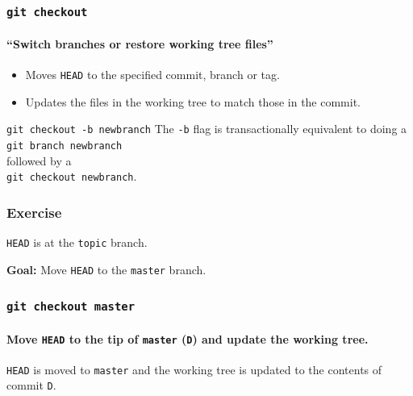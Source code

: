 \documentclass{beamer}
\newcommand\gitcmd[1]{\texttt{git #1}}
\newcommand\gflag[1]{\texttt{#1}}
\newcommand\grefspec[1]{\texttt{#1}}
\newcommand\gbranch[1]{\texttt{#1}}
\newcommand\gHEAD{\texttt{HEAD}}
\newcommand\goal[1]{\textbf{Goal:} #1}
\begin{document}
\begin{frame}
  \frametitle{\gitcmd{checkout}}
  \framesubtitle{``Switch branches or restore working tree files''}
  \begin{itemize}
    \item Moves \gHEAD{} to the specified commit, branch or tag.
    \item Updates the files in the working tree to match those in the commit.
  \end{itemize}
  \vfill
  \begin{block}{\gitcmd{checkout -b newbranch}}
    The \gflag{-b} flag is transactionally equivalent to doing a\\
    \hspace{2em}\gitcmd{branch newbranch}\\
    followed by a\\
    \hspace{2em}\gitcmd{checkout newbranch}.
  \end{block}
\end{frame}

\begin{frame}
  \frametitle{Exercise}
  \gHEAD{} is at the \gbranch{topic} branch.

  \goal{Move \gHEAD{} to the \gbranch{master} branch.}

  \begin{figure}
    \centering
  \end{figure}
\end{frame}

\begin{frame}
  \frametitle{\gitcmd{checkout master}}
  \framesubtitle{Move \gHEAD{} to the tip of \gbranch{master} (\grefspec{D}) and update the working tree.}
  \begin{figure}
    \centering
  \end{figure}

  \gHEAD{} is moved to \gbranch{master} and the working tree is updated to the contents of commit \grefspec{D}.
\end{frame}
\end{document}
